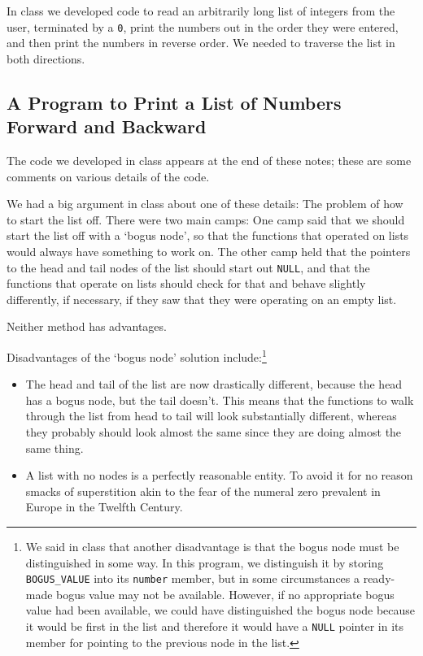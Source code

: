 In class we developed code to read an arbitrarily long list of integers
from the user, terminated by a {\tt 0}, print the numbers out in the
order they were entered, and then print the numbers in reverse order.
We needed to traverse the list in both directions.

\subsection{A Program to Print a List of Numbers Forward and Backward}

The code we developed in class appears at the end of these notes; these
are some comments on various details of the code.

We had a big argument in class about one of these details: The problem
of how to start the list off.  There were two main camps: One camp said
that we should start the list off with a `bogus node', so that the
functions that operated on lists would always have something to work on.
The other camp held that the pointers to the head and tail nodes of the
list should start out {\tt NULL}, and that the functions that operate on
lists should check for that and behave slightly differently, if
necessary, if they saw that they were operating on an empty list.

Neither method has advantages.  

Disadvantages of the `bogus node' solution include:\footnote{We said in
class that another disadvantage is that the bogus node must be
distinguished in some way.  In this program, we distinguish it by
storing {\tt BOGUS\_VALUE} into its {\tt number} member, but in some
circumstances a ready-made bogus value may not be available.  However,
if no appropriate bogus value had been available, we could have
distinguished the bogus node because it would be first in the list and
therefore it would have a {\tt NULL} pointer in its member for pointing
to the previous node in the list.}

\begin{itemize}
\item The head and tail of the list are now drastically different,
because the head has a bogus node, but the tail doesn't.  This means
that the functions to walk through the list from head to tail will look
substantially different, whereas they probably should look almost the
same since they are doing almost the same thing.
\item A list with no nodes is a perfectly reasonable entity.  To avoid
it for no reason smacks of superstition akin to the fear of the numeral
zero prevalent in Europe in the Twelfth Century.
\end{itemize}

